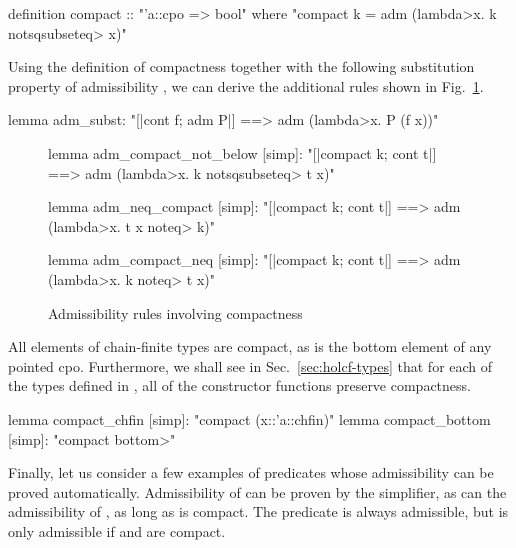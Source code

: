 \begin{isacode}
definition compact :: "'a::cpo => bool"
  where "compact k = adm (\<lambda>x. k \<notsqsubseteq> x)"
\end{isacode}

\noindent
Using the definition of compactness together with the following substitution property of admissibility \cite{hol+lcf}, we can derive the additional rules shown in Fig.~\ref{fig:holcf-compact-simps}.

\begin{isacode}
lemma adm_subst: "[|cont f; adm P|] ==> adm (\<lambda>x. P (f x))"
\end{isacode}

\begin{figure}
\begin{isacode}
lemma adm_compact_not_below [simp]:
  "[|compact k; cont t|] ==> adm (\<lambda>x. k \<notsqsubseteq> t x)"
\end{isacode}
\unmedskip
{}
\begin{isacode}
lemma adm_neq_compact [simp]: "[|compact k; cont t|] ==> adm (\<lambda>x. t x \<noteq> k)"
\end{isacode}
\unmedskip
{}
\begin{isacode}
lemma adm_compact_neq [simp]: "[|compact k; cont t|] ==> adm (\<lambda>x. k \<noteq> t x)"
\end{isacode}
\caption{Admissibility rules involving compactness}
\label{fig:holcf-compact-simps}
\end{figure}

All elements of chain-finite types are compact, as is the bottom element of any pointed cpo. Furthermore, we shall see in Sec.~\ref{sec:holcf-types} that for each of the types defined in , all of the constructor functions preserve compactness.

\begin{isacodes}
lemma compact_chfin [simp]: "compact (x::'a::chfin)"
lemma compact_bottom [simp]: "compact \<bottom>"
\end{isacodes}

Finally, let us consider a few examples of predicates whose admissibility can be proved automatically. Admissibility of  can be proven by the simplifier, as can the admissibility of , as long as  is compact. The predicate  is always admissible, but  is only admissible if  and  are compact.


